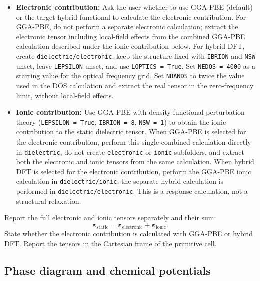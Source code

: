 \documentclass[aip,jap,reprint,amsmath,amssymb]{revtex4-2}
\begin{document}
\begin{itemize}
\item \textbf{Electronic contribution:} Ask the user whether to use GGA-PBE (default) or the target hybrid functional to calculate the electronic contribution. For GGA-PBE, do not perform a separate electronic calculation; extract the electronic tensor including local-field effects from the combined GGA-PBE calculation described under the ionic contribution below. For hybrid DFT, create \texttt{dielectric/electronic}, keep the structure fixed with \texttt{IBRION} and \texttt{NSW} unset, leave \texttt{LEPSILON} unset, and use \texttt{LOPTICS = True}.\cite{Gajdos2006} Set \texttt{NEDOS = 4000} as a starting value for the optical frequency grid. Set \texttt{NBANDS} to twice the value used in the DOS calculation and extract the real tensor in the zero-frequency limit, without local-field effects.

\item \textbf{Ionic contribution:} Use GGA-PBE with density-functional perturbation theory\cite{Baroni2001} (\texttt{LEPSILON = True}, \texttt{IBRION = 8}, \texttt{NSW = 1}) to obtain the ionic contribution to the static dielectric tensor. When GGA-PBE is selected for the electronic contribution, perform this single combined calculation directly in \texttt{dielectric}, do not create \texttt{electronic} or \texttt{ionic} subfolders, and extract both the electronic and ionic tensors from the same calculation. When hybrid DFT is selected for the electronic contribution, perform the GGA-PBE ionic calculation in \texttt{dielectric/ionic}; the separate hybrid calculation is performed in \texttt{dielectric/electronic}. This is a response calculation, not a structural relaxation.
\end{itemize}

Report the full electronic and ionic tensors separately and their sum:
\begin{equation}\label{eq:static-dielectric}
\boldsymbol{\varepsilon}_{\mathrm{static}}
=
\boldsymbol{\varepsilon}_{\mathrm{electronic}}
+
\boldsymbol{\varepsilon}_{\mathrm{ionic}}.
\end{equation}
State whether the electronic contribution is calculated with GGA-PBE or hybrid DFT. Report the tensors in the Cartesian frame of the primitive cell.

\subsection{Phase diagram and chemical potentials}\label{step:phase}
\end{document}
